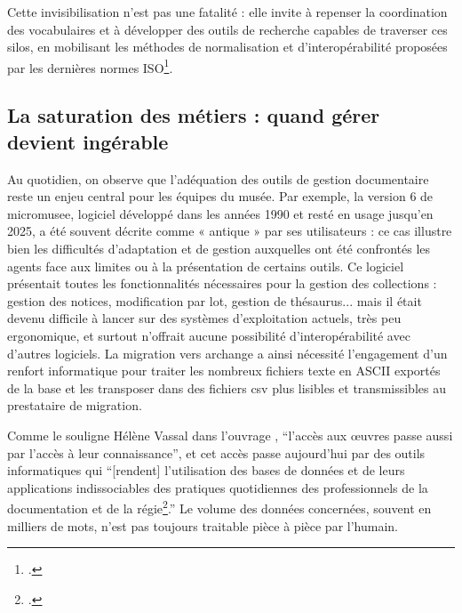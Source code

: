 Cette invisibilisation n’est pas une fatalité : elle invite à repenser la coordination des vocabulaires et à développer des outils de recherche capables de traverser ces silos, en mobilisant les méthodes de normalisation et d’interopérabilité proposées par les dernières normes ISO\footcite{chichereauNormesConceptionGestion2007}.

\subsection{La saturation des métiers : quand gérer devient ingérable}

Au quotidien, on observe que l’adéquation des outils de gestion documentaire reste un enjeu central pour les équipes du musée. Par exemple, la version 6 de \gls{micromusee}, logiciel développé dans les années 1990 et resté en usage jusqu’en 2025, a été souvent décrite comme « antique » par ses utilisateurs : ce cas illustre bien les difficultés d’adaptation et de gestion auxquelles ont été confrontés les agents face aux limites ou à la présentation de certains outils. Ce logiciel présentait toutes les fonctionnalités nécessaires pour la gestion des collections : gestion des notices, modification par lot, gestion de thésaurus... mais il était devenu difficile à lancer sur des systèmes d’exploitation actuels, très peu ergonomique, et surtout n’offrait aucune possibilité d’interopérabilité avec d’autres logiciels. La migration vers \gls{archange} a ainsi nécessité l’engagement d’un renfort informatique pour traiter les nombreux fichiers texte en ASCII exportés de la base et les transposer dans des fichiers csv plus lisibles et transmissibles au prestataire de migration.

Comme le souligne Hélène Vassal dans l'ouvrage , \enquote{l’accès aux œuvres passe aussi par l’accès à leur connaissance}, et cet accès passe aujourd’hui par des outils informatiques qui \enquote{[rendent] l’utilisation des bases de données et de leurs applications indissociables des pratiques quotidiennes des professionnels de la documentation et de la régie\footcite{merleau-pontyDocumenterCollectionsMusees2016}.} Le volume des données concernées, souvent en milliers de mots, n’est pas toujours traitable pièce à pièce par l’humain.

